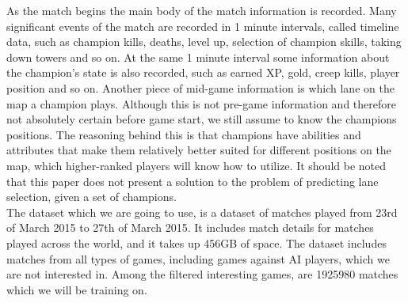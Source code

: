 As the match begins the main body of the match information is recorded. Many significant events of the match are recorded in 1 minute intervals, called timeline data, such as champion kills, deaths, level up, selection of champion skills, taking down towers and so on. At the same 1 minute interval some information about the champion’s state is also recorded, such as earned XP, gold, creep kills, player position and so on. Another piece of mid-game information is which lane on the map a champion plays. Although this is not pre-game information and therefore not absolutely certain before game start, we still assume to know the champions positions. The reasoning behind this is that champions have abilities and attributes that make them relatively better suited for different positions on the map, which higher-ranked players will know how to utilize. It should be noted that this paper does not present a solution to the problem of predicting lane selection, given a set of champions.\\


The dataset which we are going to use, is a dataset of matches played from 23rd of March 2015 to 27th of March 2015. It includes match details for matches played across the world, and it takes up 456GB of space. The dataset includes matches from all types of games, including games against AI players, which we are not interested in. Among the filtered interesting games, are 1925980 matches which we will be training on.









